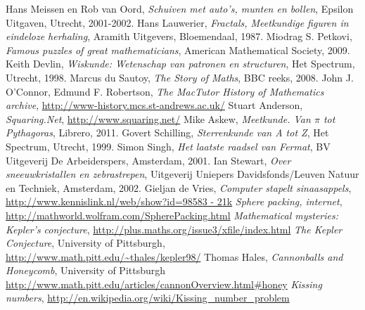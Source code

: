 
\begin{thebibliography}{8}
\label{1} Hans Meissen en Rob van Oord, \textit{Schuiven met auto's, munten en bollen}, Epsilon Uitgaven, Utrecht, 2001-2002.
\label{2} Hans Lauwerier, \textit{Fractals, Meetkundige figuren in eindeloze herhaling}, Aramith Uitgevers, Bloemendaal, 1987.
\label{3} Miodrag S. Petkovi, \textit{Famous puzzles of great mathematicians}, American Mathematical Society, 2009.
\label{4} Keith Devlin, \textit{Wiskunde: Wetenschap van patronen en structuren}, Het Spectrum, Utrecht, 1998.
\label{5} Marcus du Sautoy, \textit{The Story of Maths}, BBC reeks, 2008.
\label{6} John J. O'Connor, Edmund F. Robertson, \textit{The MacTutor History of Mathematics archive}, \url{http://www-history.mcs.st-andrews.ac.uk/}
\label{7} Stuart Anderson, \textit{Squaring.Net}, \url{http://www.squaring.net/}
\label{8} Mike Askew, \textit{Meetkunde. Van $\pi$ tot Pythagoras}, Librero, 2011.
\label{9} Govert Schilling, \textit{Sterrenkunde van A tot Z}, Het Spectrum, Utrecht, 1999.
\label{10} Simon Singh, \textit{Het laatste raadsel van Fermat}, BV Uitgeverij De Arbeiderspers, Amsterdam, 2001.
\label{11} Ian Stewart, \textit{Over sneeuwkristallen en zebrastrepen}, Uitgeverij Uniepers Davidsfonds/Leuven Natuur en Techniek, Amsterdam, 2002.
\label{12} Gieljan de Vries, \textit{Computer stapelt sinaasappels}, \url{http://www.kennislink.nl/web/show?id=98583 - 21k}
\label{13} \textit{Sphere packing, internet}, \url{http://mathworld.wolfram.com/SpherePacking.html}
\label{14} \textit{Mathematical mysteries: Kepler's conjecture}, \url{http://plus.maths.org/issue3/xfile/index.html}
\label{15} \textit{The Kepler Conjecture}, University of Pittsburgh, \url{http://www.math.pitt.edu/~thales/kepler98/}
\label{16} Thomas Hales, \textit{Cannonballs and Honeycomb}, University of Pittsburgh \url{http://www.math.pitt.edu/articles/cannonOverview.html#honey}
\label{17} \textit{Kissing numbers}, \url{http://en.wikipedia.org/wiki/Kissing_number_problem}

\end{thebibliography}